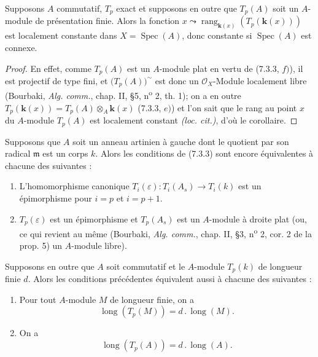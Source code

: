 
\begin{corollary}[7.3.4]
Supposons $A$ commutatif, $T_p$ exact et supposons en outre que $T_p(A)$ soit
un $A$-module de présentation finie. Alors la fonction
$x\leadsto\operatorname{rang}_{\mathbf{k}(x)}(T_p(\boldsymbol{k}(x)))$
est localement constante dans $X=\operatorname{Spec}(A)$, donc constante si
$\operatorname{Spec}(A)$ est connexe.
\end{corollary}

\begin{proof}
En effet, comme $T_p(A)$ est un $A$-module plat en vertu de (7.3.3, $f)$), il
est projectif de type fini, et $\bigl(T_p(A)\bigr)^{\sim}$ est donc un
$\mathscr O_X$-Module localement libre (Bourbaki, \emph{Alg. comm.}, chap. II,
\S 5, n\textsuperscript{o} 2, th. 1); on a en outre
$T_p(\boldsymbol{k}(x))=T_p(A)\otimes_A\boldsymbol{k}(x)$
(7.3.3, $e)$) et l'on sait que le rang au point $x$ du $A$-module $T_p(A)$ est
localement constant \emph{(loc. cit.)}, d'où le corollaire.
\end{proof}

\begin{proposition}[7.3.5]
Supposons que $A$ soit un anneau artinien à gauche dont le quotient par son
radical $\mathfrak m$ est un corps $k$. Alors les conditions de \textup{(7.3.3)} sont
encore équivalentes à chacune des suivantes :
\begin{enumerate}
  \item[g)] L'homomorphisme canonique
    $T_i(\varepsilon):T_i(A_s)\longrightarrow T_i(k)$
    est un épimorphisme pour $i=p$ et $i=p+1$.
  \item[h)] $T_p(\varepsilon)$ est un épimorphisme et $T_p(A_s)$ est un
    $A$-module à droite plat \textup{(ou, ce qui revient au même (Bourbaki,
    \emph{Alg. comm.}, chap. II, \S 3, n\textsuperscript{o} 2, cor. 2 de la
    prop. 5) un $A$-module} libre).
\end{enumerate}
Supposons en outre que $A$ soit commutatif et le $A$-module $T_p(k)$ de
longueur finie $d$. Alors les conditions précédentes équivalent aussi à
chacune des suivantes :
\begin{enumerate}
  \item[i)] Pour tout $A$-module $M$ de longueur finie, on a
    \[
      \operatorname{long}(T_p(M))=d\mathbin{.}\operatorname{long}(M).
      \tag{7.3.5.1}\label{III.7.3.5.1.fr}
    \]
  \item[j)] On a
    \[
      \operatorname{long}(T_p(A))=d\mathbin{.}\operatorname{long}(A).
      \tag{7.3.5.2}\label{III.7.3.5.2.fr}
    \]
\end{enumerate}
\end{proposition}

